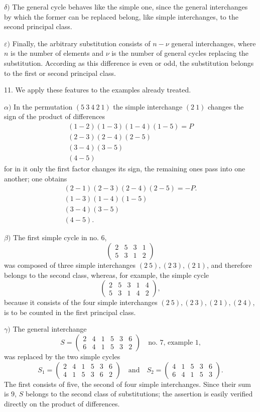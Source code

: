 \documentclass[10pt]{article}
\begin{document}
\(\delta)\) The general cycle behaves like the simple one, since the general interchanges by which the former can be replaced belong, like simple interchanges, to the second principal class.

\(\varepsilon)\) Finally, the arbitrary substitution consists of \(n-\nu\) general interchanges, where \(n\) is the number of elements and \(\nu\) is the number of general cycles replacing the substitution. According as this difference is even or odd, the substitution belongs to the first or second principal class.

11. We apply these features to the examples already treated.

\(\alpha)\) In the permutation \((5\ 3\ 4\ 2\ 1)\) the simple interchange \((2\ 1)\) changes the sign of the product of differences
\[
\begin{gathered}
(1-2)(1-3)(1-4)(1-5)=P\\
(2-3)(2-4)(2-5)\\
(3-4)(3-5)\\
(4-5)
\end{gathered}
\]
for in it only the first factor changes its sign, the remaining ones pass into one another; one obtains
\[
\begin{gathered}
(2-1)(2-3)(2-4)(2-5)=-P.\\
(1-3)(1-4)(1-5)\\
(3-4)(3-5)\\
(4-5).
\end{gathered}
\]

\(\beta)\) The first simple cycle in no. 6,
\[
\begin{pmatrix}2&5&3&1\\5&3&1&2\end{pmatrix}
\]
was composed of three simple interchanges \((2\ 5),(2\ 3),(2\ 1)\), and therefore belongs to the second class, whereas, for example, the simple cycle
\[
\begin{pmatrix}2&5&3&1&4\\5&3&1&4&2\end{pmatrix},
\]
because it consists of the four simple interchanges \((2\ 5),(2\ 3),(2\ 1),(2\ 4)\), is to be counted in the first principal class.

\(\gamma)\) The general interchange
\[
S=\begin{pmatrix}2&4&1&5&3&6\\6&4&1&5&3&2\end{pmatrix}\quad \text{no. 7, example 1,}
\]
was replaced by the two simple cycles
\[
S_1=\begin{pmatrix}2&4&1&5&3&6\\4&1&5&3&6&2\end{pmatrix}
\quad\text{and}\quad
S_2=\begin{pmatrix}4&1&5&3&6\\6&4&1&5&3\end{pmatrix}.
\]
The first consists of five, the second of four simple interchanges. Since their sum is \(9\), \(S\) belongs to the second class of substitutions; the assertion is easily verified directly on the product of differences.
\end{document}
